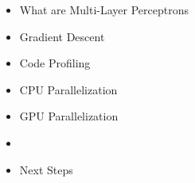 \begin{frame}
\begin{itemize}
    \item What are Multi-Layer Perceptrons
    \item Gradient Descent
    \item Code Profiling
    \item CPU Parallelization
    \item GPU Parallelization
    \item \textbf{\color{red}{Performance Results}}
    \item Next Steps
\end{itemize}
\end{frame}


